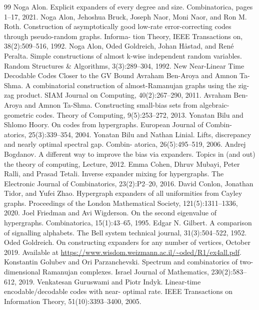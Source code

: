 \begin{thebibliography}{99}
 Noga Alon. Explicit expanders of every degree and size. Combinatorica, pages 1–17, 2021.
 Noga Alon, Jehoshua Bruck, Joseph Naor, Moni Naor, and Ron M. Roth. Construction of asymptotically good low-rate error-correcting codes through pseudo-random graphs. Informa- tion Theory, IEEE Transactions on, 38(2):509–516, 1992.
 Noga Alon, Oded Goldreich, Johan Håstad, and René Peralta. Simple constructions of almost k-wise independent random variables. Random Structures \& Algorithms, 3(3):289–304, 1992. New Near-Linear Time Decodable Codes Closer to the GV Bound
 Avraham Ben-Aroya and Amnon Ta-Shma. A combinatorial construction of almost-Ramanujan graphs using the zig-zag product. SIAM Journal on Computing, 40(2):267–290, 2011.
 Avraham Ben-Aroya and Amnon Ta-Shma. Constructing small-bias sets from algebraic- geometric codes. Theory of Computing, 9(5):253–272, 2013.
 Yonatan Bilu and Shlomo Hoory. On codes from hypergraphs. European Journal of Combin- atorics, 25(3):339–354, 2004.
 Yonatan Bilu and Nathan Linial. Lifts, discrepancy and nearly optimal spectral gap. Combin- atorica, 26(5):495–519, 2006.
 Andrej Bogdanov. A different way to improve the bias via expanders. Topics in (and out) the theory of computing, Lecture, 2012.
 Emma Cohen, Dhruv Mubayi, Peter Ralli, and Prasad Tetali. Inverse expander mixing for hypergraphs. The Electronic Journal of Combinatorics, 23(2):P2–20, 2016.
 David Conlon, Jonathan Tidor, and Yufei Zhao. Hypergraph expanders of all uniformities from Cayley graphs. Proceedings of the London Mathematical Society, 121(5):1311–1336, 2020.
 Joel Friedman and Avi Wigderson. On the second eigenvalue of hypergraphs. Combinatorica, 15(1):43–65, 1995.
 Edgar N. Gilbert. A comparison of signalling alphabets. The Bell system technical journal, 31(3):504–522, 1952.
 Oded Goldreich. On constructing expanders for any number of vertices, October 2019. Available at \url{https://www.wisdom.weizmann.ac.il/~oded/R1/ex4all.pdf}.
 Konstantin Golubev and Ori Parzanchevski. Spectrum and combinatorics of two-dimensional Ramanujan complexes. Israel Journal of Mathematics, 230(2):583–612, 2019.
 Venkatesan Guruswami and Piotr Indyk. Linear-time encodable/decodable codes with near- optimal rate. IEEE Transactions on Information Theory, 51(10):3393–3400, 2005.

\end{thebibliography}
